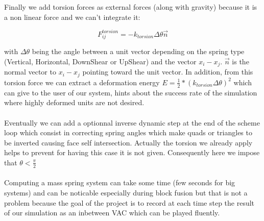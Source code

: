 \documentclass[12pt, a4paper]{report} %
\begin{document}
Finally we add torsion forces as external forces (along with gravity) because it is a non linear force and we can't integrate it:

\begin{equation}
F_{ij}^{torsion} = -k_{torsion}\Delta \theta \vec{n}
\end{equation}

with $\Delta \theta$ being the angle between a unit vector depending on the spring type (Vertical, Horizontal, DownShear or UpShear) and the vector $x_i - x_j$. $\vec{n}$ is the normal vector to $x_i - x_j$ pointing toward the unit vector. In addition, from this torsion force we can extract a deformation energy $ E = \frac{1}{2}*(k_{torsion}\Delta \theta)^2$ which can give to the user of our system, hints about the success rate of the simulation where highly deformed units are not desired.\\\\

Eventually we can add a optionnal inverse dynamic step at the end of the scheme loop which consist in correcting spring angles which make quads or triangles to be inverted causing face self intersection. Actually the torsion we already apply helps to prevent for having this case it is not given. Consequently here we impose that $\theta < \frac{\pi}{2}$ 
\\\\
Computing a mass spring system can take some time (few seconds for big systems) and can be noticable especially during block fusion but that is not a problem because the goal of the project is to record at each time step the result of our simulation as an inbetween VAC which can be played fluently.\\\\
\end{document}
